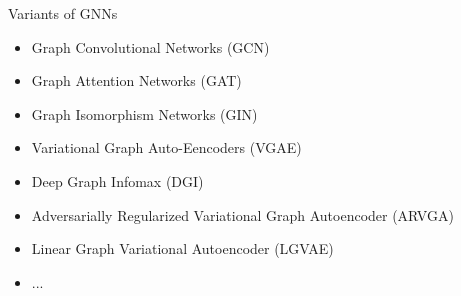 \documentclass[aspectratio=169]{beamer}
\begin{document}
        \begin{frame}{Variants of GNNs}
            \begin{itemize}
                \item Graph Convolutional Networks (GCN) %
                \item Graph Attention Networks (GAT) %
                \item Graph Isomorphism Networks (GIN) %
                
                \item Variational Graph Auto-Eencoders (VGAE) %
                \item Deep Graph Infomax (DGI) %
                \item Adversarially Regularized Variational Graph Autoencoder (ARVGA) %
                \item Linear Graph Variational Autoencoder (LGVAE) %
                \item ...
            \end{itemize}
        \end{frame}
\end{document}

